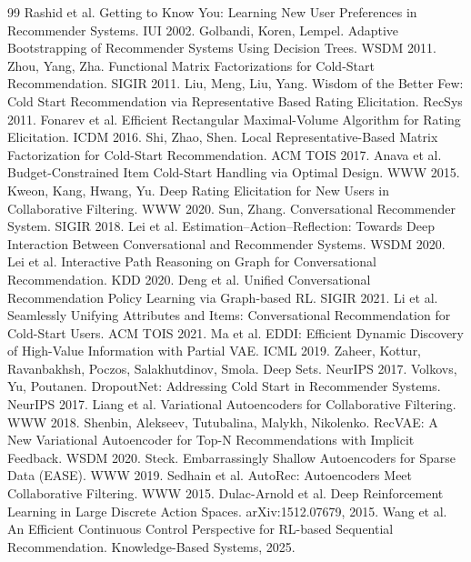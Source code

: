 \documentclass[11pt]{article}
\begin{document}
\begin{thebibliography}{99}\small
{} Rashid et al. Getting to Know You: Learning New User Preferences in Recommender Systems. IUI 2002.
 Golbandi, Koren, Lempel. Adaptive Bootstrapping of Recommender Systems Using Decision Trees. WSDM 2011.
 Zhou, Yang, Zha. Functional Matrix Factorizations for Cold-Start Recommendation. SIGIR 2011.
 Liu, Meng, Liu, Yang. Wisdom of the Better Few: Cold Start Recommendation via Representative Based Rating Elicitation. RecSys 2011.
 Fonarev et al. Efficient Rectangular Maximal-Volume Algorithm for Rating Elicitation. ICDM 2016.
 Shi, Zhao, Shen. Local Representative-Based Matrix Factorization for Cold-Start Recommendation. ACM TOIS 2017.
 Anava et al. Budget-Constrained Item Cold-Start Handling via Optimal Design. WWW 2015.
 Kweon, Kang, Hwang, Yu. Deep Rating Elicitation for New Users in Collaborative Filtering. WWW 2020.
 Sun, Zhang. Conversational Recommender System. SIGIR 2018.
 Lei et al. Estimation--Action--Reflection: Towards Deep Interaction Between Conversational and Recommender Systems. WSDM 2020.
 Lei et al. Interactive Path Reasoning on Graph for Conversational Recommendation. KDD 2020.
 Deng et al. Unified Conversational Recommendation Policy Learning via Graph-based RL. SIGIR 2021.
 Li et al. Seamlessly Unifying Attributes and Items: Conversational Recommendation for Cold-Start Users. ACM TOIS 2021.
 Ma et al. EDDI: Efficient Dynamic Discovery of High-Value Information with Partial VAE. ICML 2019.
 Zaheer, Kottur, Ravanbakhsh, Poczos, Salakhutdinov, Smola. Deep Sets. NeurIPS 2017.
 Volkovs, Yu, Poutanen. DropoutNet: Addressing Cold Start in Recommender Systems. NeurIPS 2017.
 Liang et al. Variational Autoencoders for Collaborative Filtering. WWW 2018.
 Shenbin, Alekseev, Tutubalina, Malykh, Nikolenko. RecVAE: A New Variational Autoencoder for Top-N Recommendations with Implicit Feedback. WSDM 2020.
 Steck. Embarrassingly Shallow Autoencoders for Sparse Data (EASE). WWW 2019.
 Sedhain et al. AutoRec: Autoencoders Meet Collaborative Filtering. WWW 2015.
 Dulac-Arnold et al. Deep Reinforcement Learning in Large Discrete Action Spaces. arXiv:1512.07679, 2015.
 Wang et al. An Efficient Continuous Control Perspective for RL-based Sequential Recommendation. Knowledge-Based Systems, 2025.

\end{thebibliography}
\end{document}
